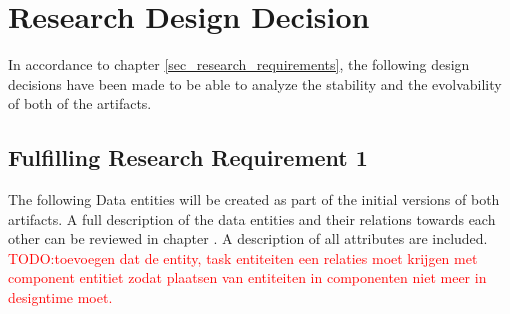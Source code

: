 \section{Research Design Decision} \label{sec_research_design_decisions}

In accordance to chapter \ref{sec_research_requirements}, the following design decisions
have been made to be able to analyze the stability and the evolvability of both
of the artifacts.

\subsection{Fulfilling Research Requirement 1}
The following Data entities will be created as part of the initial versions of both
artifacts. A full description of the data entities and their relations towards each other
can be reviewed in chapter . A description of all
attributes are included.
\textcolor{red}{
TODO:toevoegen dat de entity, task entiteiten een relaties moet krijgen met component
entitiet zodat plaatsen van entiteiten in componenten niet meer in designtime moet.}